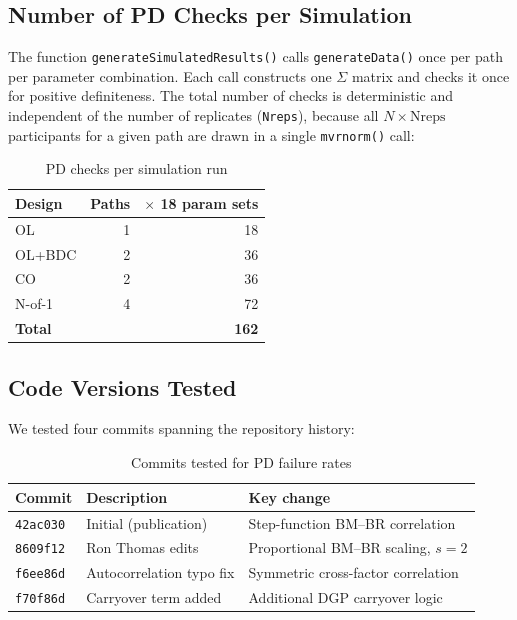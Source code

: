 \documentclass[11pt]{article}
\begin{document}
\subsection{Number of PD Checks per Simulation}

The function \texttt{generateSimulatedResults()} calls
\texttt{generateData()} once per path per parameter combination.
Each call constructs one $\Sigma$ matrix and checks it once for
positive definiteness. The total number of checks is
deterministic and independent of the number of replicates
(\texttt{Nreps}), because all $N \times \text{Nreps}$
participants for a given path are drawn in a single
\texttt{mvrnorm()} call:

\begin{table}[h]
\centering
\caption{PD checks per simulation run}
\begin{tabular}{lrr}
\toprule
Design & Paths & $\times$ 18 param sets \\
\midrule
OL & 1 & 18 \\
OL+BDC & 2 & 36 \\
CO & 2 & 36 \\
N-of-1 & 4 & 72 \\
\midrule
\textbf{Total} & & \textbf{162} \\
\bottomrule
\end{tabular}
\end{table}

\subsection{Code Versions Tested}

We tested four commits spanning the repository history:

\begin{table}[h]
\centering
\caption{Commits tested for PD failure rates}
\begin{tabular}{lll}
\toprule
Commit & Description & Key change \\
\midrule
\texttt{42ac030} & Initial (publication) &
  Step-function BM--BR correlation \\
\texttt{8609f12} & Ron Thomas edits &
  Proportional BM--BR scaling, $s = 2$ \\
\texttt{f6ee86d} & Autocorrelation typo fix &
  Symmetric cross-factor correlation \\
\texttt{f70f86d} & Carryover term added &
  Additional DGP carryover logic \\
\bottomrule
\end{tabular}
\end{table}
\end{document}

